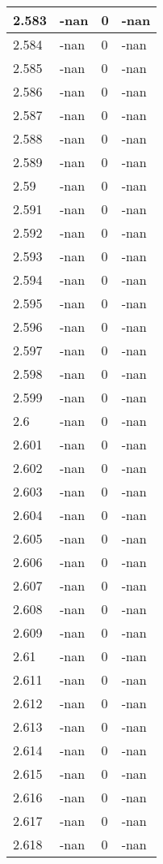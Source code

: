 \documentclass[a4paper,14pt]{extarticle}
\begin{document}
\begin{longtable}{||m{3cm}||m{3cm}|m{3cm}||m{3cm}||}
\hline
2.583 & -nan & 0 & -nan\\
\hline
2.584 & -nan & 0 & -nan\\
\hline
2.585 & -nan & 0 & -nan\\
\hline
2.586 & -nan & 0 & -nan\\
\hline
2.587 & -nan & 0 & -nan\\
\hline
2.588 & -nan & 0 & -nan\\
\hline
2.589 & -nan & 0 & -nan\\
\hline
2.59 & -nan & 0 & -nan\\
\hline
2.591 & -nan & 0 & -nan\\
\hline
2.592 & -nan & 0 & -nan\\
\hline
2.593 & -nan & 0 & -nan\\
\hline
2.594 & -nan & 0 & -nan\\
\hline
2.595 & -nan & 0 & -nan\\
\hline
2.596 & -nan & 0 & -nan\\
\hline
2.597 & -nan & 0 & -nan\\
\hline
2.598 & -nan & 0 & -nan\\
\hline
2.599 & -nan & 0 & -nan\\
\hline
2.6 & -nan & 0 & -nan\\
\hline
2.601 & -nan & 0 & -nan\\
\hline
2.602 & -nan & 0 & -nan\\
\hline
2.603 & -nan & 0 & -nan\\
\hline
2.604 & -nan & 0 & -nan\\
\hline
2.605 & -nan & 0 & -nan\\
\hline
2.606 & -nan & 0 & -nan\\
\hline
2.607 & -nan & 0 & -nan\\
\hline
2.608 & -nan & 0 & -nan\\
\hline
2.609 & -nan & 0 & -nan\\
\hline
2.61 & -nan & 0 & -nan\\
\hline
2.611 & -nan & 0 & -nan\\
\hline
2.612 & -nan & 0 & -nan\\
\hline
2.613 & -nan & 0 & -nan\\
\hline
2.614 & -nan & 0 & -nan\\
\hline
2.615 & -nan & 0 & -nan\\
\hline
2.616 & -nan & 0 & -nan\\
\hline
2.617 & -nan & 0 & -nan\\
\hline
2.618 & -nan & 0 & -nan\\

\end{longtable}
\end{document}

